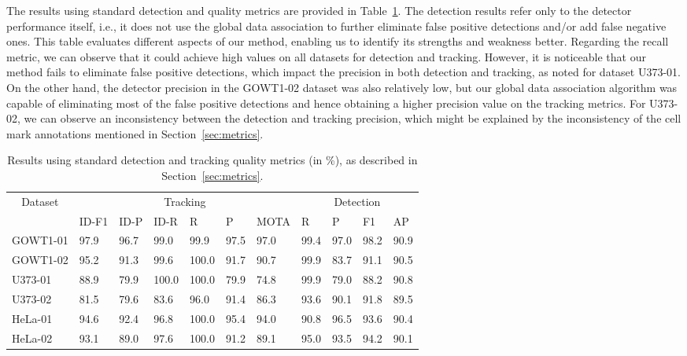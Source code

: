 \documentclass{article}
\begin{document}
The results using standard detection and quality metrics are provided in Table~\ref{tab:STD_results}. The detection results refer only to the detector performance itself, i.e., it does not use the global data association to further eliminate false positive detections and/or add false negative ones. This table evaluates different aspects of our method, enabling us to identify its strengths and weakness better. Regarding the recall metric, we can observe that it could achieve high values on all datasets for detection and tracking. However, it is noticeable that our method fails to eliminate false positive detections, which impact the precision in both detection and tracking, as noted for dataset U373-01. On the other hand, the detector precision in the GOWT1-02 dataset was also relatively low, but our global data association algorithm was capable of eliminating most of the false positive detections and hence obtaining a higher precision value on the tracking metrics. For U373-02, we can observe an inconsistency between the detection and tracking precision, which might be explained by the inconsistency of the cell mark annotations mentioned in Section~\ref{sec:metrics}.

\begin{table}[]
\caption[Results using standard detection and tracking quality metrics.]{Results using standard detection and tracking quality metrics (in \%), as described in Section~\ref{sec:metrics}.}
\centering
\begin{tabular}{l|llllll|llll}
\multicolumn{1}{c|}{\multirow{2}{*}{Dataset}} & \multicolumn{6}{c|}{Tracking} & \multicolumn{4}{c}{Detection} \\ \cline{2-11} 
\multicolumn{1}{c|}{} & ID-F1 & ID-P & ID-R & R & P & MOTA & R & P & F1 & AP \\ \hline
GOWT1-01 & 97.9 & 96.7 & 99.0 & 99.9 & 97.5 & 97.0 & 99.4 & 97.0 & 98.2 & 90.9 \\
GOWT1-02 & 95.2 & 91.3 & 99.6 & 100.0 & 91.7 & 90.7 & 99.9 & 83.7 & 91.1 & 90.5 \\
U373-01 & 88.9 & 79.9 & 100.0 & 100.0 & 79.9 & 74.8 & 99.9 & 79.0 & 88.2 & 90.8 \\
U373-02 & 81.5 & 79.6 & 83.6 & 96.0 & 91.4 & 86.3 & 93.6 & 90.1 & 91.8 & 89.5 \\
HeLa-01 & 94.6 & 92.4 & 96.8 & 100.0 & 95.4 & 94.0 & 90.8 & 96.5 & 93.6 & 90.4 \\
HeLa-02 & 93.1 & 89.0 & 97.6 & 100.0 & 91.2 & 89.1 & 95.0 & 93.5 & 94.2 & 90.1
\end{tabular}
\label{tab:STD_results}
\end{table}
\end{document}
